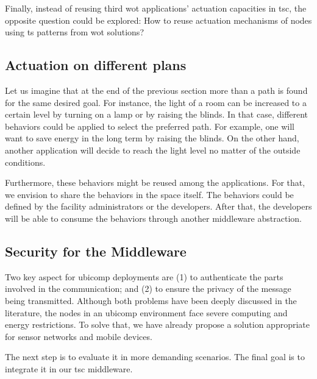 Finally, instead of reusing third \ac{wot} applications' actuation capacities in \ac{tsc}, the opposite question could be explored:
How to reuse actuation mechanisms of nodes using \ac{ts} patterns from \ac{wot} solutions?


\subsection{Actuation on different plans}

Let us imagine that at the end of the previous section more than a path is found for the same desired goal.
For instance, the light of a room can be increased to a certain level by turning on a lamp or by raising the blinds.
In that case, different behaviors could be applied to select the preferred path.
For example, one will want to save energy in the long term by raising the blinds.
On the other hand, another application will decide to reach the light level no matter of the outside conditions.

Furthermore, these behaviors might be reused among the applications. %
For that, we envision to share the behaviors in the space itself. %
The behaviors could be defined by the facility administrators or the developers.
After that, the developers will be able to consume the behaviors through another middleware abstraction.


\subsection{Security for the Middleware}

Two key aspect for \ac{ubicomp} deployments are
(1) to authenticate the parts involved in the communication; and
(2) to ensure the privacy of the message being transmitted.
Although both problems have been deeply discussed in the literature,
the nodes in an \ac{ubicomp} environment face severe computing and energy restrictions.
To solve that, we have already propose a solution appropriate for sensor networks and mobile devices.

The next step is to evaluate it in more demanding scenarios.
The final goal is to integrate it in our \ac{tsc} middleware.


